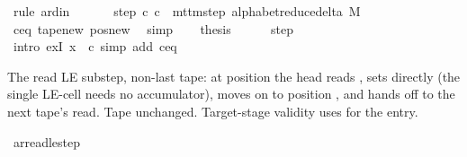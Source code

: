 \begin{isabellebody}
\ {\isacharparenleft}{\kern0pt}rule\ ard{\isacharunderscore}{\kern0pt}in{\isacharparenright}{\kern0pt}\isanewline
\ \ \isamarkupfalse%
\isanewline
\ \ \isamarkupfalse%
\ step{\isacharcolon}{\kern0pt}\ {\isachardoublequoteopen}{\isacharparenleft}{\kern0pt}c{\isacharprime}{\kern0pt}{\isacharcomma}{\kern0pt}\ {\isacharquery}{\kern0pt}c{\isacharprime}{\kern0pt}{\isacharprime}{\kern0pt}{\isacharparenright}{\kern0pt}\ {\isasymin}\ mttm{\isacharunderscore}{\kern0pt}step\ {\isacharparenleft}{\kern0pt}alphabet{\isacharunderscore}{\kern0pt}reduce{\isacharunderscore}{\kern0pt}delta\ M{\isacharparenright}{\kern0pt}{\isachardoublequoteclose}\isanewline
\ \ \ \ \isamarkupfalse%
\ c{\isacharprime}{\kern0pt}{\isacharunderscore}{\kern0pt}eq\ tape{\isacharunderscore}{\kern0pt}new\ pos{\isacharunderscore}{\kern0pt}new\ \isamarkupfalse%
\ simp\isanewline
\ \ \isamarkupfalse%
\ {\isacharquery}{\kern0pt}thesis\isanewline
\ \ \ \ \isamarkupfalse%
\ step\ \isamarkupfalse%
\ {\isacharparenleft}{\kern0pt}intro\ exI{\isacharbrackleft}{\kern0pt}\ x\ {\isacharequal}{\kern0pt}\ {\isacharquery}{\kern0pt}c{\isacharprime}{\kern0pt}{\isacharprime}{\kern0pt}{\isacharbrackright}{\kern0pt}{\isacharparenright}{\kern0pt}\ {\isacharparenleft}{\kern0pt}simp\ add{\isacharcolon}{\kern0pt}\ c{\isacharprime}{\kern0pt}{\isacharunderscore}{\kern0pt}eq{\isacharparenright}{\kern0pt}\isanewline
{}\isamarkupfalse%
%
\endisatagproof
{\isafoldproof}%
%
\isadelimproof
%
\endisadelimproof
%
\begin{isamarkuptext}%
The read LE substep, non-last tape: at position  the
  head reads , sets  directly (the
  single LE-cell needs no accumulator), moves  on 
  to position , and hands off to the next tape's read.  Tape
  unchanged.  Target-stage validity uses 
  for the  entry.%
\end{isamarkuptext}\isamarkuptrue%
\isamarkupfalse%
\ ar{\isacharunderscore}{\kern0pt}read{\isacharunderscore}{\kern0pt}le{\isacharunderscore}{\kern0pt}step{\isacharcolon}{\kern0pt}\isanewline

\end{isabellebody}
